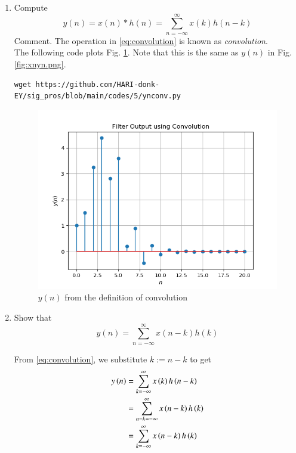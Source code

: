 \documentclass[journal,12pt,twocolumn]{IEEEtran}
\renewcommand\thesection{\arabic{section}}
\begin{document}
\begin{enumerate}[label=\thesection.\arabic*]
\item Compute 
%
\begin{equation}
\label{eq:convolution}
y(n) = x(n)*h(n) = \sum_{n=-\infty}^{\infty}x(k)h(n-k)
\end{equation}
%
Comment. The operation in \eqref{eq:convolution} is known as
{\em convolution}.
%
\\
\solution The following code plots Fig. \ref{fig:ynconv.png}. Note that this is the same as 
$y(n)$ in  Fig. 
\ref{fig:xnyn.png}. 
%
\begin{lstlisting}
wget https://github.com/HARI-donk-EY/sig_pros/blob/main/codes/5/ynconv.py
\end{lstlisting}
\begin{figure}[!ht]
\centering
\includegraphics[width=\columnwidth]{./figs/ynconv.png}
\caption{$y(n)$ from the definition of convolution}
\label{fig:ynconv.png}
\end{figure}


\item Show that
\begin{equation}
y(n) =  \sum_{n=-\infty}^{\infty}x(n-k)h(k)
\end{equation}

\solution 
From \eqref{eq:convolution}, we substitute $k := n - k$ to get
\begin{align}
y\left(n\right) &= \sum_{k=-\infty}^{\infty}x\left(k\right)h\left(n - k\right) \\
		  &= \sum_{n - k=-\infty}^{\infty}x\left(n - k\right)h\left(k\right) \\
		  &= \sum_{k=-\infty}^{\infty}x\left(n - k\right)h\left(k\right)
\end{align}

\end{enumerate}
\end{document}
